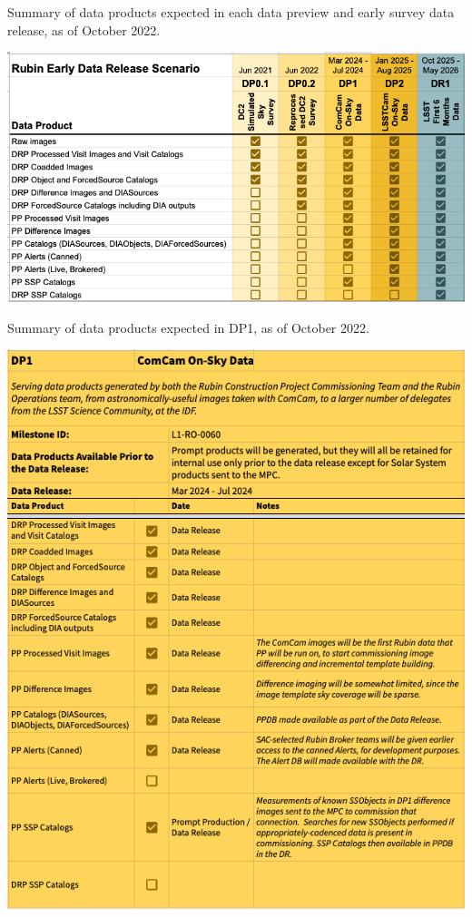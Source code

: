 \begin{table}
\caption{Summary of data products expected in each data preview and early survey data release, as of October 2022.}
\label{tab:summary}
\includegraphics[width=\linewidth]{figures/DPR-summary}
\end{table}

\begin{table}
\caption{Summary of data products expected in DP1, as of October 2022.}
\label{tab:dp-one-products}
\includegraphics[width=\linewidth]{figures/DP1-products}
\end{table}

